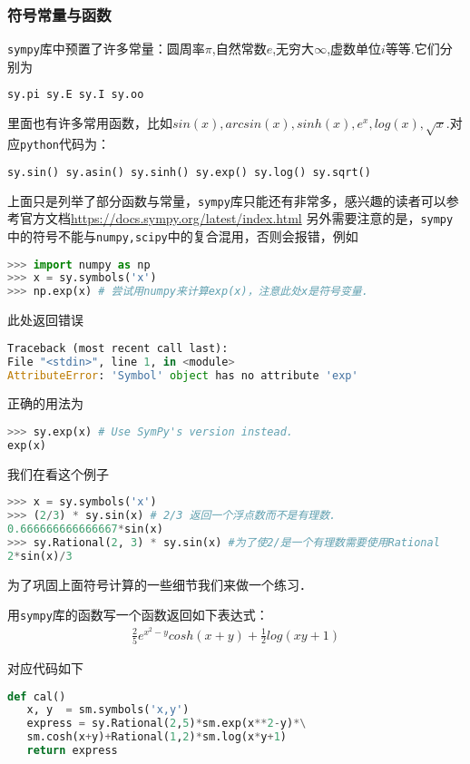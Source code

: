 \subsubsection{符号常量与函数}
\verb|sympy|库中预置了许多常量：圆周率$\pi$,自然常数$e$,无穷大$\infty$,虚数单位$i$等等.它们分别为
\begin{lstlisting}[language=python]
sy.pi sy.E sy.I sy.oo
\end{lstlisting}
里面也有许多常用函数，比如$sin(x), arcsin(x), sinh(x), e^x,
log(x),\sqrt{x}$.对应\verb|python|代码为：
\begin{lstlisting}[language=python]
sy.sin() sy.asin() sy.sinh() sy.exp() sy.log() sy.sqrt()
\end{lstlisting}
上面只是列举了部分函数与常量，\verb|sympy|库只能还有非常多，感兴趣的读者可以参考官方文档\href{https://docs.sympy.org/latest/index.html#}{https://docs.sympy.org/latest/index.html}
另外需要注意的是，\verb|sympy|中的符号不能与\verb|numpy,scipy|中的复合混用，否则会报错，例如
\begin{lstlisting}[language=python]
>>> import numpy as np
>>> x = sy.symbols('x')
>>> np.exp(x) # 尝试用numpy来计算exp(x)，注意此处x是符号变量.
\end{lstlisting}
此处返回错误
\begin{lstlisting}[language=python]
Traceback (most recent call last):
File "<stdin>", line 1, in <module>
AttributeError: 'Symbol' object has no attribute 'exp'
\end{lstlisting}
正确的用法为
\begin{lstlisting}[language=python]
>>> sy.exp(x) # Use SymPy's version instead.
exp(x)
\end{lstlisting}
我们在看这个例子
\begin{lstlisting}[language=python]
>>> x = sy.symbols('x')
>>> (2/3) * sy.sin(x) # 2/3 返回一个浮点数而不是有理数.
0.666666666666667*sin(x)
>>> sy.Rational(2, 3) * sy.sin(x) #为了使2/是一个有理数需要使用Rational
2*sin(x)/3
\end{lstlisting}
为了巩固上面符号计算的一些细节我们来做一个练习．
\begin{example}{}
用\verb|sympy|库的函数写一个函数返回如下表达式：
\begin{align}
\frac{2}{5}e^{x^2-y}cosh(x+y)+\frac{1}{2}log(xy+1)
\end{align}


对应代码如下
\begin{lstlisting}[language=python]
def cal()
   x, y  = sm.symbols('x,y')
   express = sy.Rational(2,5)*sm.exp(x**2-y)*\
   sm.cosh(x+y)+Rational(1,2)*sm.log(x*y+1)
   return express

\end{lstlisting}
\end{example}

